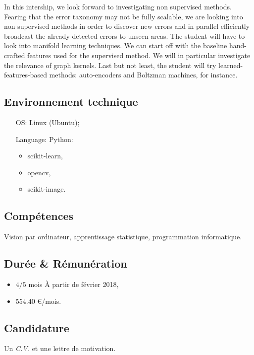 \documentclass[a4paper,11pt]{article}
\begin{document}
In this intership, we look forward to investigating non supervised methods. Fearing that the error taxonomy may not be fully scalable, we are looking into non supervised methods in order to discover new errors and in parallel efficiently broadcast the already detected errors to unseen areas. The student will have to look into manifold learning techniques. We can start off with the baseline hand-crafted features used for the supervised method. We will in particular investigate the relevance of graph kernels. Last but not least, the student will try learned-features-based methods: auto-encoders and Boltzman machines, for instance.

    \subsection*{Environnement technique}
    \begin{itemize}
        \item[OS:] Linux (Ubuntu);
        \item[Language:] Python:
        \begin{itemize}
            \item scikit-learn,
            \item opencv,
            \item scikit-image.
        \end{itemize}
    \end{itemize}

    \subsection*{Compétences}
    Vision par ordinateur, apprentissage statistique, programmation informatique.


    \subsection*{Durée \& Rémunération}
    \begin{itemize}
        \item $4/5$ mois \`A partir de février 2018,
        \item $554.40$ \euro/mois.
    \end{itemize}

    \subsection*{Candidature}
    Un \textit{C.V.} et une lettre de motivation.
\end{document}
